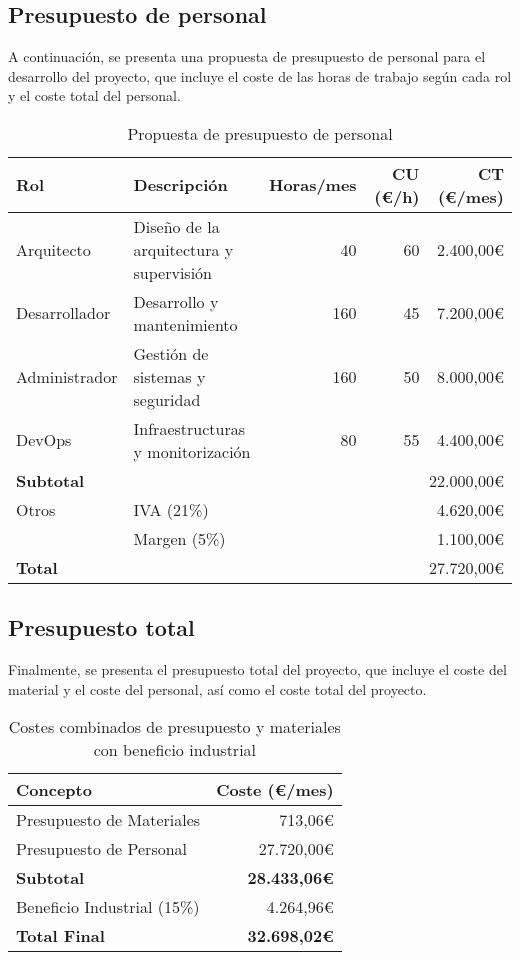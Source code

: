 \subsection{Presupuesto de personal}\label{subsec:pres_personal}
A continuación, se presenta una propuesta de presupuesto de personal para el
desarrollo del proyecto, que incluye el coste de las horas de trabajo según
cada rol y el coste total del personal.

\begin{table}[h]
	\centering
	\small
	\begin{tabular}{|l|l|r|r|r|}
	\hline
	\textbf{Rol} & \textbf{Descripción} & \textbf{Horas/mes} & \textbf{CU (€/h)} & \textbf{CT (€/mes)} \\
	\hline
	\hline
	Arquitecto & Diseño de la arquitectura y supervisión & 40 & 60 & 2.400,00€ \\
	\hline
	Desarrollador & Desarrollo y mantenimiento & 160 & 45 & 7.200,00€ \\
	\hline
	Administrador & Gestión de sistemas y seguridad & 160 & 50 & 8.000,00€ \\
	\hline
	DevOps & Infraestructuras y monitorización & 80 & 55 & 4.400,00€ \\
	\hline
	\textbf{Subtotal} & \multicolumn{4}{|r|}{22.000,00€} \\
	\hline
	\hline
	Otros & \multicolumn{3}{|l|}{IVA (21\%)} & 4.620,00€ \\
	 & \multicolumn{3}{|l|}{Margen (5\%)} & 1.100,00€ \\
	\hline
	\textbf{Total} & \multicolumn{4}{|r|}{27.720,00€} \\
	\hline
	\end{tabular}
	\caption{Propuesta de presupuesto de personal}
	\label{tab:presupuesto_personal_aws}
\end{table}


\subsection{Presupuesto total}\label{subsec:pres_total}
Finalmente, se presenta el presupuesto total del proyecto, que incluye el coste
del material y el coste del personal, así como el coste total del proyecto.

\begin{table}[h]
	\centering
	\small
	\begin{tabular}{|l|r|}
	\hline
	\textbf{Concepto} & \textbf{Coste (€/mes)} \\
	\hline
	\hline
	Presupuesto de Materiales & 713,06€ \\
	\hline
	Presupuesto de Personal & 27.720,00€ \\
	\hline
	\hline
	\textbf{Subtotal} & \textbf{28.433,06€} \\
	\hline
	Beneficio Industrial (15\%) & 4.264,96€ \\
	\hline
	\textbf{Total Final} & \textbf{32.698,02€} \\
	\hline
	\end{tabular}
	\caption{Costes combinados de presupuesto y materiales con beneficio industrial}
	\label{tab:costes_combinados}
\end{table}
